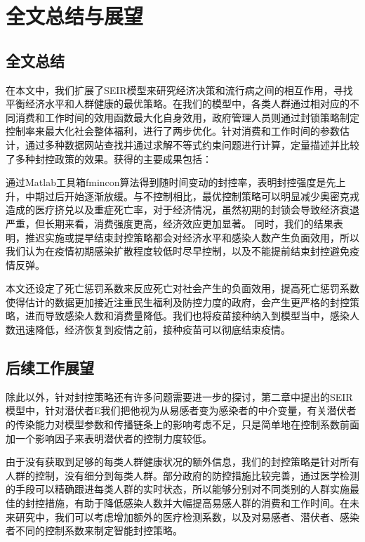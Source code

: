 \section{全文总结与展望}
\subsection{全文总结}
在本文中，我们扩展了SEIR模型来研究经济决策和流行病之间的相互作用，寻找平衡经济水平和人群健康的最优策略。在我们的模型中，各类人群通过相对应的不同消费和工作时间的效用函数最大化自身效用，政府管理人员则通过封锁策略制定控制率来最大化社会整体福利，进行了两步优化。针对消费和工作时间的参数估计，通过多种数据网站查找并通过求解不等式约束问题进行计算，定量描述并比较了多种封控政策的效果。获得的主要成果包括：

通过Matlab工具箱fmincon算法得到随时间变动的封控率，表明封控强度是先上升，中期过后开始逐渐放缓。与不控制相比，最优控制策略可以明显减少奥密克戎造成的医疗挤兑以及重症死亡率，对于经济情况，虽然初期的封锁会导致经济衰退严重，但长期来看，消费强度更高，经济效应更加显著。
同时，我们的结果表明，推迟实施或提早结束封控策略都会对经济水平和感染人数产生负面效用，所以我们认为在疫情初期感染扩散程度较低时尽早控制，以及不能提前结束封控避免疫情反弹。

本文还设定了死亡惩罚系数来反应死亡对社会产生的负面效用，提高死亡惩罚系数使得估计的数据更加接近注重民生福利及防控力度的政府，会产生更严格的封控策略，进而导致感染人数和消费量降低。我们也将疫苗接种纳入到模型当中，感染人数迅速降低，经济恢复到疫情之前，接种疫苗可以彻底结束疫情。
\subsection{后续工作展望}
除此以外，针对封控策略还有许多问题需要进一步的探讨，第二章中提出的SEIR模型中，针对潜伏者E我们把他视为从易感者变为感染者的中介变量，有关潜伏者的传染能力对模型参数和传播链条上的影响考虑不足，只是简单地在控制系数前面加一个影响因子来表明潜伏者的控制力度较低。

由于没有获取到足够的每类人群健康状况的额外信息，我们的封控策略是针对所有人群的控制，没有细分到每类人群。部分政府的防控措施比较完善，通过医学检测的手段可以精确跟进每类人群的实时状态，所以能够分别对不同类别的人群实施最佳的封控措施，有助于降低感染人数并大幅提高易感人群的消费和工作时间。在未来研究中，我们可以考虑增加额外的医疗检测系数，以及对易感者、潜伏者、感染者不同的控制系数来制定智能封控策略。
